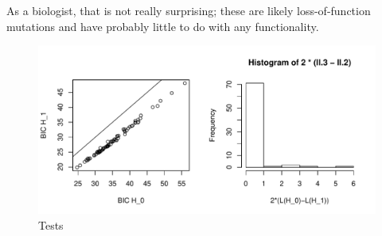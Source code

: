 \documentclass[10pt,letterpaper]{article}
\begin{document}
As a biologist, that is not really surprising; these are likely loss-of-function mutations and have probably little to do with any functionality.



\begin{figure}[h!]
  \caption{Tests}
  \centering
    \includegraphics[width=1.2\textwidth]{kellis2.pdf}
\end{figure}
\end{document}
